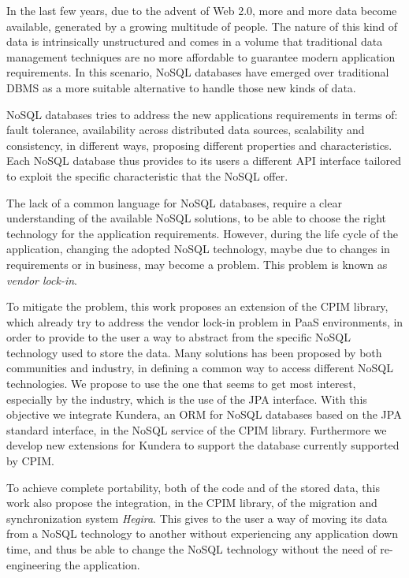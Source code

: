 In the last few years, due to the advent of Web 2.0, more and more data become available, generated by a growing multitude of people. The nature of this kind of data is intrinsically unstructured and comes in a volume that traditional data management techniques are no more affordable to guarantee modern application requirements.
In this scenario, NoSQL databases have emerged over traditional DBMS as a more suitable alternative to handle those new kinds of data.

\noindent NoSQL databases tries to address the new applications requirements in terms of: fault tolerance, availability across distributed data sources, scalability and consistency, in different ways, proposing different properties and characteristics. 
Each NoSQL database thus provides to its users a different API interface tailored to exploit the specific characteristic that the NoSQL offer.

\noindent The lack of a common language for NoSQL databases, require a clear understanding of the available NoSQL solutions, to be able to choose the right technology for the application requirements. However, during the life cycle of the application, changing the adopted NoSQL technology, maybe due to changes in requirements or in business, may become a problem. This problem is known as \textit{vendor lock-in}.    

\noindent To mitigate the problem, this work proposes an extension of the CPIM library, which already try to address the vendor lock-in problem in PaaS environments, in order to provide to the user a way to abstract from the specific NoSQL technology used to store the data.
Many solutions has been proposed by both communities and industry, in defining a common way to access different NoSQL technologies. We propose to use the one that seems to get most interest, especially by the industry, which is the use of the JPA interface. With this objective we integrate Kundera, an ORM for NoSQL databases based on the JPA standard interface, in the NoSQL service of the CPIM library. Furthermore we develop new extensions for Kundera to support the database currently supported by CPIM.

\noindent To achieve complete portability, both of the code and of the stored data, this work also propose the integration, in the CPIM library, of the migration and synchronization system \textit{Hegira}. This gives to the user a way of moving its data from a NoSQL technology to another without experiencing any application down time, and thus be able to change the NoSQL technology without the need of re-engineering the application.
 
